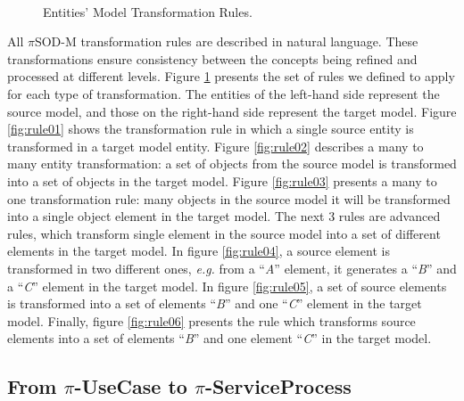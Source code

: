 \begin{figure}[ht!]
  ~
  ~ %
  \caption{Entities' Model Transformation Rules.}
  \label{fig:rules}
\end{figure}




 All $\pi$SOD-M transformation rules are described in natural language.
 These transformations ensure consistency between the concepts being refined and
 processed at different levels. Figure \ref{fig:rules} presents the set of rules
we defined to apply for each type of transformation. The entities of the
left-hand side represent the source model, and those on the right-hand side
represent the target model. Figure \ref{fig:rule01} shows the transformation
rule in which a single source entity is transformed in a target model entity.
Figure \ref{fig:rule02} describes a many to many entity transformation: a set of
objects from the source model is transformed into a set of objects in the target
model. Figure \ref{fig:rule03} presents a many to one transformation rule: many
objects in the source model it will be transformed into a single object element
in the target model. The next 3 rules are advanced rules, which transform single element in the source model into a set of different elements
in the target model. In figure \ref{fig:rule04}, a source element is
transformed in two different ones, \textit{e.g.} from a ``\textit{A}'' element,
it generates a ``\textit{B}'' and a ``\textit{C}'' element in the target model.
In figure \ref{fig:rule05}, a set of source elements is
transformed into a set of elements ``\textit{B}'' and one ``\textit{C}'' element
in the target model. Finally, figure \ref{fig:rule06} presents the rule which
transforms source elements into a set of elements
``\textit{B}'' and one element ``\textit{C}'' in the target model.

\subsection{From $\pi$-UseCase to
$\pi$-ServiceProcess}

